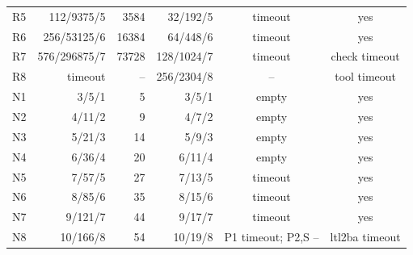 \begin{table}[t]
\begin{tabular}{@{}lrrrcc@{}}
R5 & 112/9375/5 & 3584 & 32/192/5 & timeout & yes\\
R6 & 256/53125/6 & 16384 & 64/448/6 & timeout & yes\\
R7 & 576/296875/7 & 73728 & 128/1024/7 & timeout & check timeout\\
R8 & timeout & -- & 256/2304/8 & -- & tool timeout\\
N1 & 3/5/1 & 5 & 3/5/1 & empty & yes\\
N2 & 4/11/2 & 9 & 4/7/2 & empty & yes\\
N3 & 5/21/3 & 14 & 5/9/3 & empty & yes\\
N4 & 6/36/4 & 20 & 6/11/4 & empty & yes\\
N5 & 7/57/5 & 27 & 7/13/5 & timeout & yes\\
N6 & 8/85/6 & 35 & 8/15/6 & timeout & yes\\
N7 & 9/121/7 & 44 & 9/17/7 & timeout & yes\\
N8 & 10/166/8 & 54 & 10/19/8 & P1 timeout; P2,S -- & ltl2ba timeout\\
\bottomrule
\end{tabular}
\end{table}
